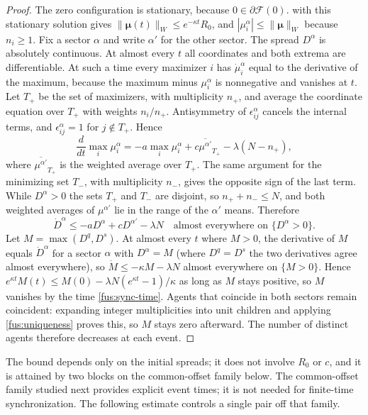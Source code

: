 \begin{proof}
The zero configuration is stationary, because $0\in\partial\mathcal F(0)$.
 with this stationary solution gives
$\|\boldsymbol\mu(t)\|_W\leq e^{-\kappa t}R_0$, and
$|\mu_i^\alpha|\leq\|\boldsymbol\mu\|_W$ because $n_i\geq1$. Fix a sector
$\alpha$ and write $\alpha'$ for the other sector. The spread $D^\alpha$ is
absolutely continuous. At almost every $t$ all coordinates and both extrema
are differentiable. At such a time every maximizer $i$ has
$\dot\mu_i^\alpha$ equal to the derivative of the maximum, because the
maximum minus $\mu_i^\alpha$ is nonnegative and vanishes at $t$. Let $T_+$
be the set of maximizers, with multiplicity $n_+$, and average the
coordinate equation over $T_+$ with weights $n_i/n_+$. Antisymmetry of
$\epsilon_{ij}^\alpha$ cancels the internal terms, and
$\epsilon_{ij}^\alpha=1$ for $j\notin T_+$. Hence
\begin{equation}
 \frac{d}{dt}\max_i\mu_i^\alpha
 =-a\max_i\mu_i^\alpha+c\overline{\mu^{\alpha'}}_{T_+}-\lambda(N-n_+),
\end{equation}
where $\overline{\mu^{\alpha'}}_{T_+}$ is the weighted average over $T_+$.
The same argument for the minimizing set $T_-$, with multiplicity $n_-$,
gives the opposite sign of the last term. While $D^\alpha>0$ the sets $T_+$
and $T_-$ are disjoint, so $n_++n_-\leq N$, and both weighted averages of
$\mu^{\alpha'}$ lie in the range of the $\alpha'$ means. Therefore
\begin{equation}
 \dot D^\alpha\leq-aD^\alpha+cD^{\alpha'}-\lambda N
 \quad\text{almost everywhere on }\{D^\alpha>0\}.
\end{equation}
Let $M=\max(D^q,D^s)$. At almost every $t$ where $M>0$, the derivative of
$M$ equals $\dot D^\alpha$ for a sector $\alpha$ with $D^\alpha=M$ (where
$D^q=D^s$ the two derivatives agree almost everywhere), so
$\dot M\leq-\kappa M-\lambda N$ almost everywhere on $\{M>0\}$. Hence
$e^{\kappa t}M(t)\leq M(0)-\lambda N(e^{\kappa t}-1)/\kappa$ as long as $M$
stays positive, so $M$ vanishes by the time \cref{fus:sync-time}. Agents
that coincide in both sectors remain coincident: expanding integer
multiplicities into unit children and applying \cref{fus:uniqueness} proves
this, so $M$ stays zero afterward. The number of distinct agents therefore
decreases at each event.
\end{proof}

The bound depends only on the initial spreads; it does not involve $R_0$ or
$c$, and it is attained by two blocks on the common-offset family below. The
common-offset family studied next provides explicit event times; it is not
needed for finite-time synchronization. The following estimate controls a
single pair off that family.

